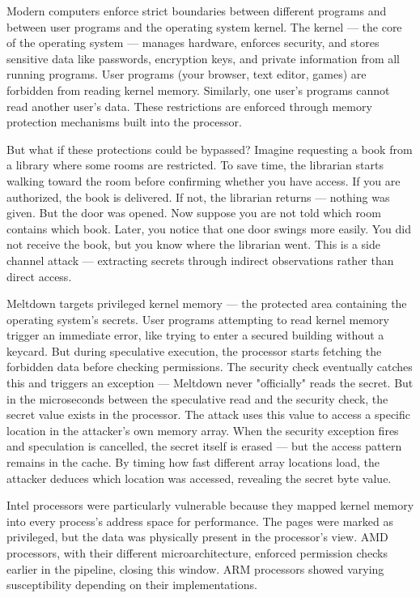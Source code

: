 Modern computers enforce strict boundaries between different programs and between user programs and the operating system kernel. The kernel — the core of the operating system — manages hardware, enforces security, and stores sensitive data like passwords, encryption keys, and private information from all running programs. User programs (your browser, text editor, games) are forbidden from reading kernel memory. Similarly, one user's programs cannot read another user's data. These restrictions are enforced through memory protection mechanisms built into the processor.

But what if these protections could be bypassed? Imagine requesting a book from a library where some rooms are restricted. To save time, the librarian starts walking toward the room before confirming whether you have access. If you are authorized, the book is delivered. If not, the librarian returns — nothing was given. But the door was opened. Now suppose you are not told which room contains which book. Later, you notice that one door swings more easily. You did not receive the book, but you know where the librarian went. This is a side channel attack — extracting secrets through indirect observations rather than direct access.

Meltdown targets privileged kernel memory — the protected area containing the operating system's secrets. User programs attempting to read kernel memory trigger an immediate error, like trying to enter a secured building without a keycard. But during speculative execution, the processor starts fetching the forbidden data before checking permissions. The security check eventually catches this and triggers an exception — Meltdown never "officially" reads the secret. But in the microseconds between the speculative read and the security check, the secret value exists in the processor. The attack uses this value to access a specific location in the attacker's own memory array. When the security exception fires and speculation is cancelled, the secret itself is erased — but the access pattern remains in the cache. By timing how fast different array locations load, the attacker deduces which location was accessed, revealing the secret byte value.

Intel processors were particularly vulnerable because they mapped kernel memory into every process's address space for performance. The pages were marked as privileged, but the data was physically present in the processor's view. AMD processors, with their different microarchitecture, enforced permission checks earlier in the pipeline, closing this window. ARM processors showed varying susceptibility depending on their implementations.

